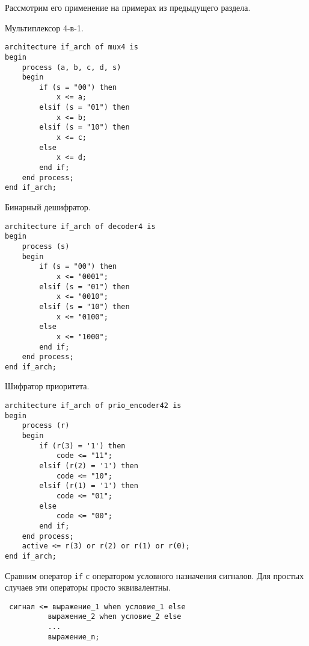 Рассмотрим его применение на примерах из предыдущего раздела.

 Мультиплексор 4-в-1.

\begin{Code}
\begin{lstlisting}
architecture if_arch of mux4 is
begin
    process (a, b, c, d, s)
    begin
        if (s = "00") then
            x <= a;
        elsif (s = "01") then
            x <= b;
        elsif (s = "10") then
            x <= c;
        else
            x <= d;
        end if;
    end process;
end if_arch;
\end{lstlisting}
\end{Code}

 Бинарный дешифратор.

\begin{Code}
\begin{lstlisting}
architecture if_arch of decoder4 is
begin
    process (s)
    begin
        if (s = "00") then
            x <= "0001";
        elsif (s = "01") then
            x <= "0010";
        elsif (s = "10") then
            x <= "0100";
        else
            x <= "1000";
        end if;
    end process;
end if_arch;
\end{lstlisting}
\end{Code}

 Шифратор приоритета.

\begin{Code}
\begin{lstlisting}
architecture if_arch of prio_encoder42 is
begin
    process (r)
    begin
        if (r(3) = '1') then
            code <= "11";
        elsif (r(2) = '1') then
            code <= "10";
        elsif (r(1) = '1') then
            code <= "01";
        else
            code <= "00";
        end if;
    end process;
    active <= r(3) or r(2) or r(1) or r(0);
end if_arch;
\end{lstlisting}
\end{Code}

Сравним оператор \lstinline?if? с оператором условного назначения сигналов. Для простых случаев эти операторы просто эквивалентны.

\begin{Code}
\begin{lstlisting}
 сигнал <= выражение_1 when условие_1 else 
          выражение_2 when условие_2 else 
          ...
          выражение_n;
\end{lstlisting}
\end{Code}

